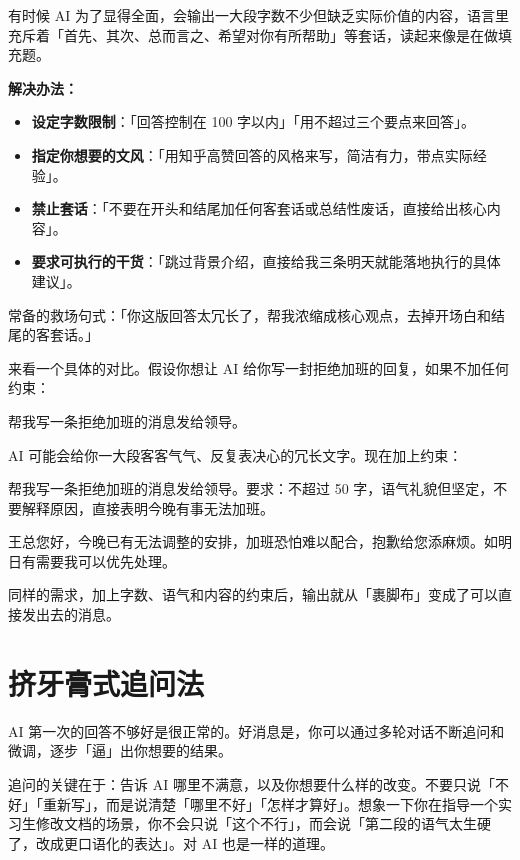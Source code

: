 有时候 AI 为了显得全面，会输出一大段字数不少但缺乏实际价值的内容，语言里充斥着「首先、其次、总而言之、希望对你有所帮助」等套话，读起来像是在做填充题。

\textbf{解决办法：}

\begin{itemize}
  \item \textbf{设定字数限制}：「回答控制在 100 字以内」「用不超过三个要点来回答」。
  \item \textbf{指定你想要的文风}：「用知乎高赞回答的风格来写，简洁有力，带点实际经验」。
  \item \textbf{禁止套话}：「不要在开头和结尾加任何客套话或总结性废话，直接给出核心内容」。
  \item \textbf{要求可执行的干货}：「跳过背景介绍，直接给我三条明天就能落地执行的具体建议」。
\end{itemize}

\begin{tipbox}
常备的救场句式：「你这版回答太冗长了，帮我浓缩成核心观点，去掉开场白和结尾的客套话。」
\end{tipbox}

来看一个具体的对比。假设你想让 AI 给你写一封拒绝加班的回复，如果不加任何约束：

\begin{promptbox}
帮我写一条拒绝加班的消息发给领导。
\end{promptbox}

AI 可能会给你一大段客客气气、反复表决心的冗长文字。现在加上约束：

\begin{promptbox}
帮我写一条拒绝加班的消息发给领导。要求：不超过 50 字，语气礼貌但坚定，不要解释原因，直接表明今晚有事无法加班。
\end{promptbox}

\begin{aibox}
王总您好，今晚已有无法调整的安排，加班恐怕难以配合，抱歉给您添麻烦。如明日有需要我可以优先处理。
\end{aibox}

同样的需求，加上字数、语气和内容的约束后，输出就从「裹脚布」变成了可以直接发出去的消息。

\section{挤牙膏式追问法}

AI 第一次的回答不够好是很正常的。好消息是，你可以通过多轮对话不断追问和微调，逐步「逼」出你想要的结果。

追问的关键在于：告诉 AI 哪里不满意，以及你想要什么样的改变。不要只说「不好」「重新写」，而是说清楚「哪里不好」「怎样才算好」。想象一下你在指导一个实习生修改文档的场景，你不会只说「这个不行」，而会说「第二段的语气太生硬了，改成更口语化的表达」。对 AI 也是一样的道理。

